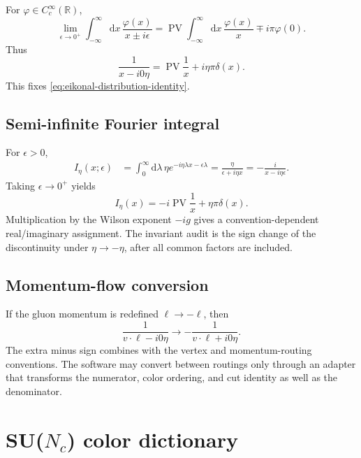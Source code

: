 \documentclass[11pt]{article}
\newcommand{\dd}{\mathrm{d}}
\newcommand{\PV}{\operatorname{PV}}
\begin{document}
For \(\varphi\in C_c^\infty(\mathbb R)\),
\begin{equation}
 \lim_{\epsilon\to0^+}
 \int_{-\infty}^{\infty}\dd x\,
 \frac{\varphi(x)}{x\pm i\epsilon}
 =\PV\int_{-\infty}^{\infty}\dd x\,
 \frac{\varphi(x)}{x}
 \mp i\pi\varphi(0).
\label{eq:sokhotski-plemelj}
\end{equation}
Thus
\begin{equation}
 \frac1{x-i0\eta}
 =\PV\frac1x+i\eta\pi\delta(x).
\label{eq:sokhotski-eta}
\end{equation}
This fixes \cref{eq:eikonal-distribution-identity}.

\subsection{Semi-infinite Fourier integral}

For \(\epsilon>0\),
\begin{align}
 I_\eta(x;\epsilon)
 &=\int_0^\infty\dd\lambda\,
   \eta e^{-i\eta\lambda x-\epsilon\lambda}
 =\frac{\eta}{\epsilon+i\eta x}
 =-\frac{i}{x-i\eta\epsilon}.
\label{eq:semi-infinite-regulated}
\end{align}
Taking \(\epsilon\to0^+\) yields
\begin{equation}
 I_\eta(x)
 =-i\PV\frac1x+\eta\pi\delta(x).
\label{eq:semi-infinite-pv-delta}
\end{equation}
Multiplication by the Wilson exponent \(-ig\) gives a convention-dependent
real/imaginary assignment.  The invariant audit is the sign change of the
discontinuity under \(\eta\to-\eta\), after all common factors are included.

\subsection{Momentum-flow conversion}

If the gluon momentum is redefined \(\ell\to-\ell\), then
\begin{equation}
 \frac{1}{v\cdot\ell-i0\eta}
 \longrightarrow
 -\frac{1}{v\cdot\ell+i0\eta}.
\label{eq:momentum-flow-pole}
\end{equation}
The extra minus sign combines with the vertex and momentum-routing
conventions.  The software may convert between routings only through an
adapter that transforms the numerator, color ordering, and cut identity as
well as the denominator.

\section{SU(\texorpdfstring{\(N_c\)}{Nc}) color dictionary}
\label{app:color}
\end{document}
